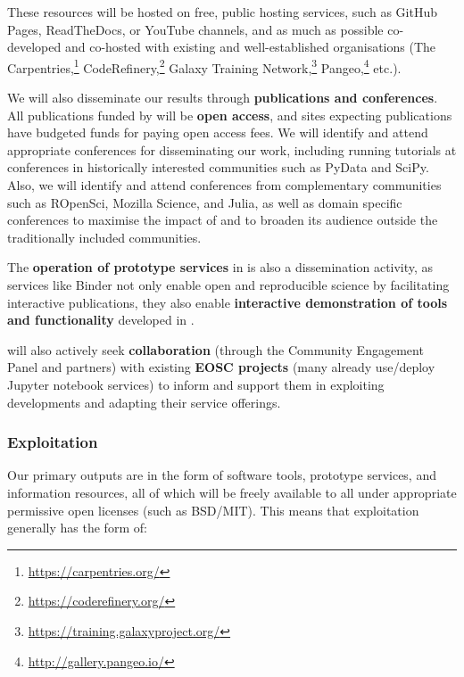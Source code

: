 These resources will be hosted on free, public hosting services,
such as GitHub Pages, ReadTheDocs, or YouTube channels, and as much as possible co-developed and co-hosted with existing and
well-established organisations
(The Carpentries,\footnote{\url{https://carpentries.org/}} CodeRefinery,\footnote{\url{https://coderefinery.org/}}
Galaxy Training Network,\footnote{\url{https://training.galaxyproject.org/}} Pangeo,\footnote{\url{http://gallery.pangeo.io/}} etc.).

We will also disseminate our results through \textbf{publications and conferences}.
All publications funded by \TheProject will be \textbf{open access},
and sites expecting publications have budgeted funds for paying open access fees.
We will identify and attend appropriate conferences for disseminating our work,
including running tutorials at conferences in historically interested communities such as PyData and SciPy.
Also, we will identify and attend conferences from complementary communities such as ROpenSci,
Mozilla Science, and Julia,
as well as domain specific conferences to maximise the impact of \TheProject and to broaden its
audience outside the
traditionally included communities.

The \textbf{operation of prototype services} in  is also a dissemination activity,
as services like Binder not only enable open and reproducible science by facilitating interactive publications,
they also enable \textbf{interactive demonstration of tools and functionality}
developed in \TheProject.

\TheProject will also actively seek \textbf{collaboration} (through the Community
Engagement Panel and
\TheProject partners) with existing \textbf{EOSC projects} (many already use/deploy
Jupyter notebook services) to inform and support them in exploiting \TheProject
developments and adapting their service offerings.
\subsubsection{Exploitation}

Our primary outputs are in the form of software tools, prototype services, and information resources,
all of which will be freely available to all under appropriate permissive open
licenses (such as BSD/MIT).
This means that exploitation generally has the form of:

